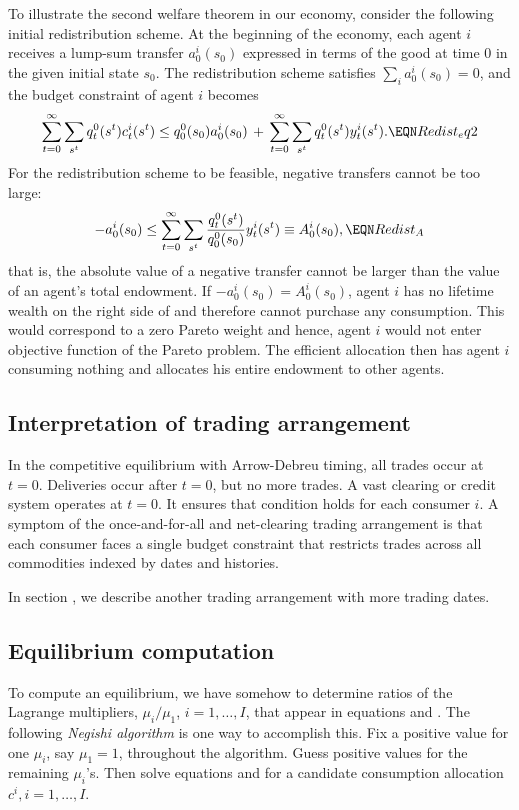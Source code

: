 To illustrate the second welfare theorem in our economy, 
consider the following initial redistribution scheme.
At the beginning of the economy, each agent $i$
receives a lump-sum transfer $a_0^i(s_0)$ expressed in 
terms of the good at time 0 in the given initial state
$s_0$. The redistribution scheme satisfies
$\sum_i a_0^i(s_0) = 0$, and the budget constraint of 
agent $i$ becomes 
$$ \sum_{t=0}^\infty \sum_{s^t}  q_t^0(s^t)  c_t^i(s^t)   \leq  q_0^0(s_0) a_0^i(s_0) \,+\,
   \sum_{t=0}^\infty \sum_{s^t}  q_t^0(s^t) y_t^i(s^t).   \EQN Redist_eq2 $$
For the redistribution scheme to be feasible,
negative transfers cannot be too large:
$$ - a_0^i(s_0) \leq 
 \sum_{t=0}^\infty \sum_{s^t}  {q_t^0(s^t) \over 
                                q_0^0(s_0)} y_t^i(s^t)
  \equiv A_0^i(s_0),                    \EQN Redist_A
$$   
that is, the absolute value of a negative transfer 
cannot be larger than the value of an agent's total
endowment. If $ - a_0^i(s_0) = A_0^i(s_0)$, 
agent $i$ has no lifetime wealth on the 
right side of  and therefore  cannot
purchase any consumption. This would correspond to a zero 
Pareto weight and hence, agent $i$ would not
enter objective function  of the 
Pareto problem. The efficient allocation then  has 
agent $i$ consuming nothing and allocates  his entire 
endowment  to other agents.


\subsection{Interpretation of trading arrangement}
  In the  competitive   equilibrium with Arrow-Debreu timing, all trades occur at $t=0$.  Deliveries occur after $t=0$, but no more trades.
  A vast clearing or credit system operates at $t=0$.
It ensures that condition  holds for each consumer
$i$.   A symptom of the once-and-for-all and net-clearing trading arrangement is
that each consumer faces a single  budget constraint that restricts  trades across all commodities indexed by  dates and histories.


  In section , we describe another trading arrangement with
more trading dates. %


\subsection{Equilibrium computation}\label{sec:Negishi}%
To compute an equilibrium, we have somehow to determine ratios of
the Lagrange multipliers, $\mu_i / \mu_1$, $i=1, \ldots, I $,
that appear in equations  and .  The following {\it
Negishi algorithm\/} is one way to accomplish this.
\medskip
{}  Fix a positive value for one $\mu_i$, say $\mu_1=1$,
throughout the algorithm.  Guess  positive values for the
remaining  $\mu_i$'s. Then solve  equations  and  for
a candidate consumption allocation $c^i, i=1, \ldots, I$.


